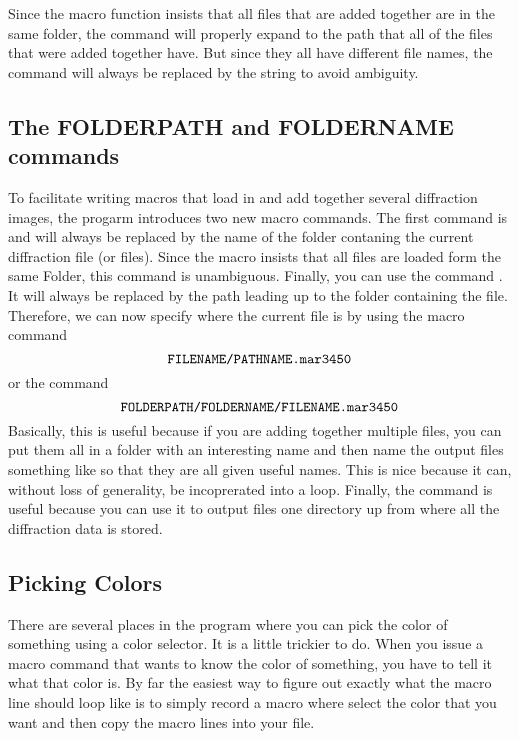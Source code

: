 Since the macro function insists that all files 
that are added together are in the same folder,
the  command will properly expand 
to the path that all of the files that were added 
together have. But since they all have different file 
names, the  command will always be 
replaced by the string 
to avoid ambiguity.

\subsection{The FOLDERPATH and FOLDERNAME commands}

To facilitate writing macros that load in and 
add together several diffraction images, the progarm
introduces two new macro commands. The first command is
 and will always be replaced
by the name of the folder contaning the current
diffraction file (or files). Since the macro insists 
that all files are loaded form the same Folder, this
command is unambiguous. Finally, you can use the 
command . It will always be 
replaced by the path leading up to the folder 
containing the file. Therefore, we can now specify 
where the current file is by using the macro command
\begin{equation*}
    \text{{\ttfamily FILENAME/PATHNAME.mar3450}}
\end{equation*}
or the command
\begin{equation*}
    \text{{\ttfamily FOLDERPATH/FOLDERNAME/FILENAME.mar3450}}
\end{equation*}
Basically, this is useful because if you are adding
together multiple files, you can put them all in a
folder with an interesting name and then name 
the output files something like 
 so that they are all
given useful names. This is nice because it can, without
loss of generality, be incoprerated into a loop. Finally,
the  command is useful because you
can use it to output files one directory up from where all
the diffraction data is stored.

\subsection{Picking Colors}

There are several places in the program where you can
pick the color of something using a color selector.
It is a little trickier to do.  When you issue a macro 
command that wants to know the color of something, you 
have to tell it what that color is. By far the easiest
way to figure out exactly what the macro line should
loop like is to simply record a macro where select
the color that you want and then copy the macro lines
into your file.

